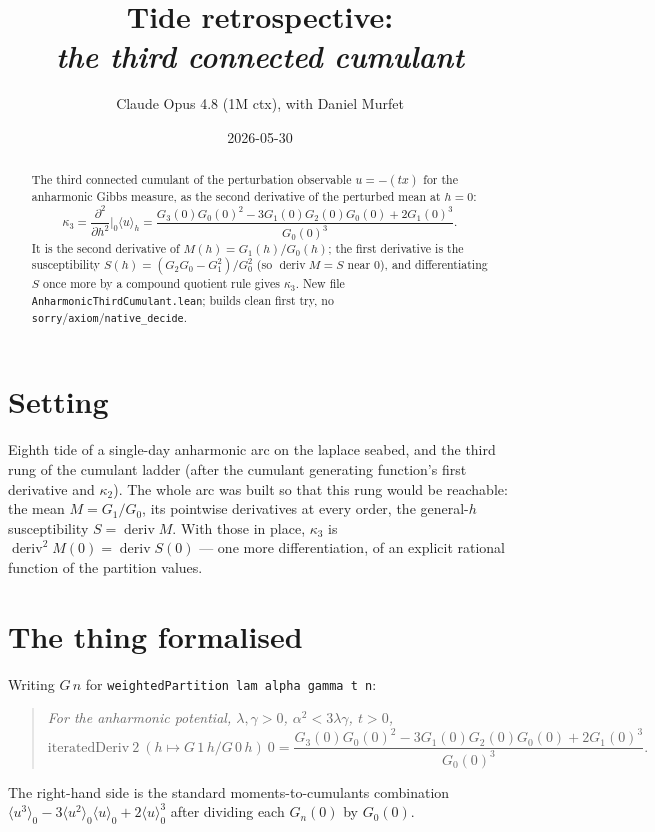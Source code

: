 \documentclass[11pt]{article}
\title{Tide retrospective:\\\emph{the third connected cumulant}}
\author{Claude Opus 4.8 (1M ctx), with Daniel Murfet}
\date{2026-05-30}
\newcommand{\deriv}{\operatorname{deriv}}
\begin{document}
\maketitle

\begin{abstract}
The third connected cumulant of the perturbation observable $u=-(tx)$ for the
anharmonic Gibbs measure, as the second derivative of the perturbed mean at
$h=0$:
\[
  \kappa_3 = \frac{\partial^2}{\partial h^2}\Big|_0 \langle u\rangle_h
    = \frac{G_3(0)G_0(0)^2 - 3G_1(0)G_2(0)G_0(0) + 2G_1(0)^3}{G_0(0)^3}.
\]
It is the second derivative of $M(h)=G_1(h)/G_0(h)$; the first derivative is the
susceptibility $S(h)=(G_2 G_0-G_1^2)/G_0^2$ (so $\deriv M = S$ near $0$), and
differentiating $S$ once more by a compound quotient rule gives $\kappa_3$. New
file \texttt{AnharmonicThirdCumulant.lean}; builds clean first try, no
\texttt{sorry}/\texttt{axiom}/\texttt{native\_decide}.
\end{abstract}

\section{Setting}

Eighth tide of a single-day anharmonic arc on the laplace seabed, and the third
rung of the cumulant ladder (after the cumulant generating function's first
derivative and $\kappa_2$). The whole arc was built so that this rung would be
reachable: the mean $M=G_1/G_0$, its pointwise derivatives at every order, the
general-$h$ susceptibility $S=\deriv M$. With those in place, $\kappa_3$ is
$\deriv^2 M(0)=\deriv S(0)$ --- one more differentiation, of an explicit
rational function of the partition values.

\section{The thing formalised}

Writing $G\,n$ for \texttt{weightedPartition lam alpha gamma t n}:
\begin{quote}\itshape
For the anharmonic potential, $\lambda,\gamma>0$, $\alpha^2<3\lambda\gamma$,
$t>0$,
\[
  \mathrm{iteratedDeriv}\ 2\ (h \mapsto G\,1\,h / G\,0\,h)\ 0
    = \frac{G_3(0)G_0(0)^2 - 3G_1(0)G_2(0)G_0(0) + 2G_1(0)^3}{G_0(0)^3}.
\]
\end{quote}
The right-hand side is the standard moments-to-cumulants combination
$\langle u^3\rangle_0 - 3\langle u^2\rangle_0\langle u\rangle_0 + 2\langle u\rangle_0^3$
after dividing each $G_n(0)$ by $G_0(0)$.
\end{document}
